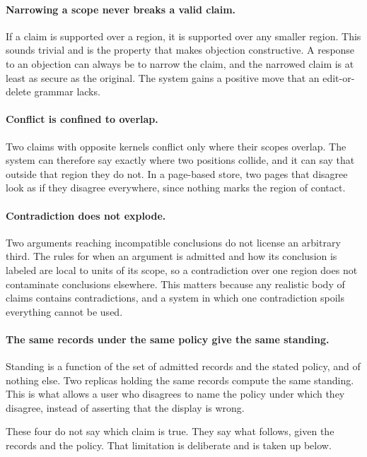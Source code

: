 \documentclass[11pt]{article}
\begin{document}
\paragraph{Narrowing a scope never breaks a valid claim.} If a claim is supported over a region, it is supported over any smaller region. This sounds trivial and is the property that makes objection constructive. A response to an objection can always be to narrow the claim, and the narrowed claim is at least as secure as the original. The system gains a positive move that an edit-or-delete grammar lacks.

\paragraph{Conflict is confined to overlap.} Two claims with opposite kernels conflict only where their scopes overlap. The system can therefore say exactly where two positions collide, and it can say that outside that region they do not. In a page-based store, two pages that disagree look as if they disagree everywhere, since nothing marks the region of contact.

\paragraph{Contradiction does not explode.} Two arguments reaching incompatible conclusions do not license an arbitrary third. The rules for when an argument is admitted and how its conclusion is labeled are local to units of its scope, so a contradiction over one region does not contaminate conclusions elsewhere. This matters because any realistic body of claims contains contradictions, and a system in which one contradiction spoils everything cannot be used.

\paragraph{The same records under the same policy give the same standing.} Standing is a function of the set of admitted records and the stated policy, and of nothing else. Two replicas holding the same records compute the same standing. This is what allows a user who disagrees to name the policy under which they disagree, instead of asserting that the display is wrong.

These four do not say which claim is true. They say what follows, given the records and the policy. That limitation is deliberate and is taken up below.
\end{document}
